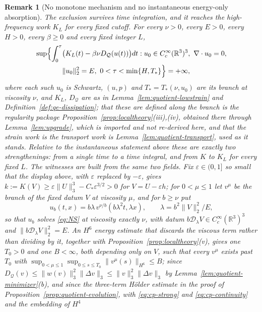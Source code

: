 \documentclass[11pt]{article}
\newtheorem{remark}[theorem]{Remark}
\theoremstyle{definition}
\theoremstyle{plain}
\newcommand{\R}{\mathbb R}
\newcommand{\norm}[1]{\lVert #1\rVert}
\begin{document}
\begin{remark}[No monotone mechanism and no instantaneous energy-only
absorption]
The exclusion survives time integration, and it reaches the high-frequency
work $K_L$ for every fixed cutoff.  For every $\nu>0$, every $E>0$, every
$H>0$, every $\beta\geq0$ and every fixed integer $L$,
\begin{equation}\label{eq:no-monotone-spacetime}
\begin{split}
 \sup\Bigl\{\int_0^\tau&\bigl(K_L(t)-\beta\nu D_{\mathcal Q}(u(t))\bigr)dt:
 u_0\in C_c^\infty(\R^3)^3,\ \nabla\cdot u_0=0,\\
 &\norm{u_0}_2^2=E,\ 0<\tau<\min\{H,T_*\}\Bigr\}=+\infty ,
\end{split}
\end{equation}
where each such $u_0$ is Schwartz, $(u,p)$ and $T_*=T_*(\nu,u_0)$ are its
branch at viscosity $\nu$, and $K_L$, $D_{\mathcal Q}$ are as in
Lemma~\ref{lem:quotient-lowstrain} and Definition~\ref{def:qe-dissipation};
that these are defined along the branch is the regularity package
Proposition~\ref{prop:localtheory}(iii),(iv), obtained there through
Lemma~\ref{lem:upgrade}, which is imported and not re-derived here, and that
the strain work is the transport work is
Lemma~\ref{lem:quotient-transport}, used as it stands.  Relative to the
instantaneous statement above these are exactly two strengthenings: from a
single time to a time integral, and from $K$ to $K_L$ for every fixed $L$.
The witnesses are built from the same two fields.  Fix $\varepsilon\in(0,1]$
so small that the display above, with $\varepsilon$ replaced by
$-\varepsilon$, gives
$k:=K(V)\geq\varepsilon\norm U_3^3-C_*\varepsilon^{3/2}>0$ for
$V=U-\varepsilon h$; for $0<\mu\leq1$ let $v^\mu$ be the branch of the fixed
datum $V$ at viscosity $\mu$, and for $b\geq\nu$ put
\[
 u_b(t,x)=b\lambda\,v^{\nu/b}(b\lambda^2t,\lambda x),
 \qquad\lambda=b^2\norm V_2^2/E ,
\]
so that $u_b$ solves \eqref{eq:NS} at viscosity exactly $\nu$, with datum
$b\mathcal D_\lambda V\in C_c^\infty(\R^3)^3$ and
$\norm{b\mathcal D_\lambda V}_2^2=E$.  An $H^6$ energy estimate that discards
the viscous term rather than dividing by it, together with
Proposition~\ref{prop:localtheory}(v), gives one $T_0>0$ and one $B<\infty$,
both depending only on $V$, such that every $v^\mu$ exists past $T_0$ with
$\sup_{0<\mu\leq1}\sup_{0\leq s\leq T_0}\norm{v^\mu(s)}_{H^6}\leq B$; since
$D_{\mathcal Q}(v)\leq\norm{w(v)}_3^2\norm{\Delta v}_3\leq\norm v_3^2\norm{\Delta v}_3$
by Lemma~\ref{lem:quotient-minimizer}(b), and since the three-term H\"older
estimate in the proof of Proposition~\ref{prop:quotient-evolution}, with
\eqref{eq:cp-strong} and \eqref{eq:cp-continuity} and the embedding of $H^4$

\end{remark}
\end{document}
